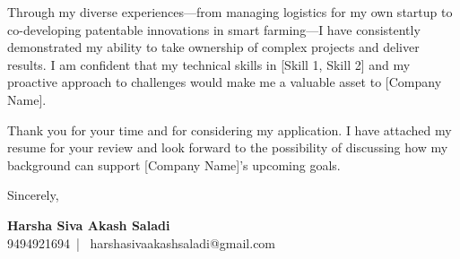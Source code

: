 \documentclass[a4paper,11pt]{article}
\makeatletter
\newcommand{\name}{Harsha Siva Akash Saladi } %
\newcommand{\phone}{9494921694} %
\newcommand{\emaild}{harshasivaakashsaladi@gmail.com} %
\makeatother
\begin{document}
Through my diverse experiences—from managing logistics for my own startup to co-developing patentable innovations in smart farming—I have consistently demonstrated my ability to take ownership of complex projects and deliver results. I am confident that my technical skills in [Skill 1, Skill 2] and my proactive approach to challenges would make me a valuable asset to [Company Name].

Thank you for your time and for considering my application. I have attached my resume for your review and look forward to the possibility of discussing how my background can support [Company Name]'s upcoming goals.

\vspace{20pt}

\noindent Sincerely,

\vspace{10pt}

\noindent \textbf{\name} \\
\phone \ | \ \emaild
\end{document}
